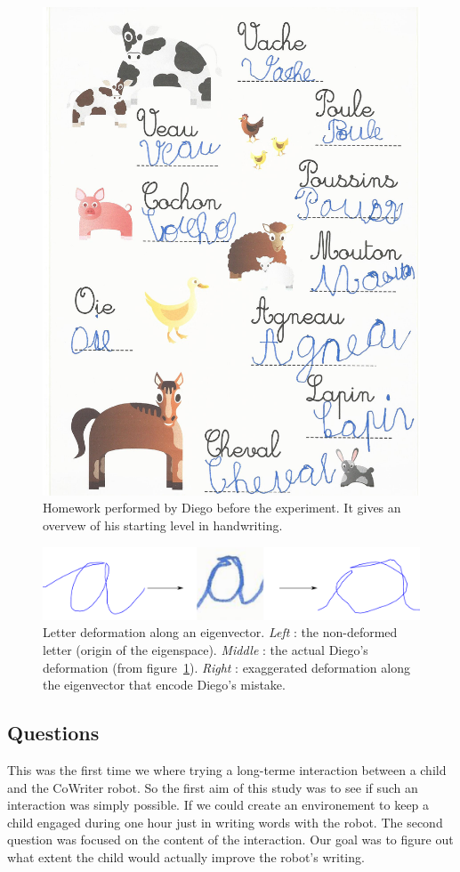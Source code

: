 \documentclass{sig-alternate}
\begin{document}
\begin{figure}
    \centering
    \includegraphics[width=0.9\linewidth]{diego_start}
    \caption{Homework performed by Diego before the experiment. It gives an
    overvew of his starting level in handwriting.}
    \label{fig:diego_start}
\end{figure}

\begin{figure}
    \centering
    \includegraphics[width=0.9\linewidth]{3a}
    \caption{Letter deformation along an eigenvector. \emph{Left} : the non-deformed
        letter (origin of the eigenspace). \emph{Middle} : the actual Diego's
        deformation (from figure~\ref{fig:diego_start}). \emph{Right} : exaggerated
deformation along the eigenvector that encode Diego's mistake.} 
    \label{fig:3a}
\end{figure}

\subsection{Questions}
This was the first time we where trying a long-terme interaction between a child
and the CoWriter robot. So the first aim of this study was to see if such an
interaction was simply possible. If we could create an environement to keep a child engaged
during one hour just in writing words with the robot.
The second question was focused on the content of the interaction. Our goal was
to figure out what extent the child would actually improve the robot's writing. 
\end{document}
